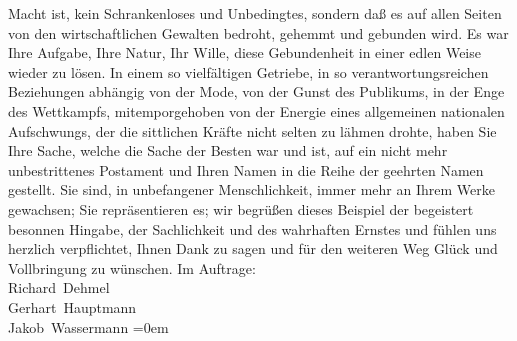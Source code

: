 \begin{ledgroupsized}[t]{13cm}
                    Macht ist, kein Schrankenloses und Unbedingtes, sondern daß es auf allen Seiten
                    von den wirtschaftlichen Gewalten bedroht, gehemmt und gebunden wird. Es war
                    Ihre Aufgabe, Ihre Natur, Ihr Wille, {\pb}diese Gebundenheit in einer
                    edlen Weise wieder zu lösen. In einem so vielfältigen Getriebe, in so
                    verantwortungsreichen Beziehungen abhängig von der Mode, von der Gunst des
                    Publikums, in der Enge des Wettkampfs, mitemporgehoben von der Energie eines
                    allgemeinen nationalen Aufschwungs, der die sittlichen Kräfte nicht selten zu
                    lähmen drohte, haben Sie Ihre Sache, welche die Sache der Besten war und ist,
                    auf ein nicht mehr unbestrittenes Postament und Ihren Namen in die Reihe der
                    geehrten Namen gestellt. Sie sind, in unbefangener Menschlichkeit, immer mehr an
                    Ihrem Werke gewachsen; Sie repräsentieren es; wir begrüßen dieses Beispiel der
                    begeistert besonnen Hingabe, der Sachlichkeit und des wahrhaften Ernstes und
                    fühlen uns herzlich verpflichtet, Ihnen Dank zu sagen und für den weiteren Weg
                    Glück und Vollbringung zu wünschen.\pend
           \pstart
           Im Auftrage:{\\[\baselineskip]}\spacefill\mbox{Richard Dehmel}{\\[\baselineskip]}\spacefill\mbox{Gerhart Hauptmann}{\\[\baselineskip]}\spacefill\mbox{Jakob Wassermann}\pend
           \leftskip=0em{}\endnumbering{}\end{ledgroupsized}  \newcommand{\dateiname}{L01892}\newcommand{\titel}{Richard Dehmel, Gerhart Hauptmann und Jakob Wassermann an Arthur Schnitzler, 3. 12. 1909}\newcommand{\editorInnen}{Martin Anton Müller und Gerd-Hermann Susen}
      